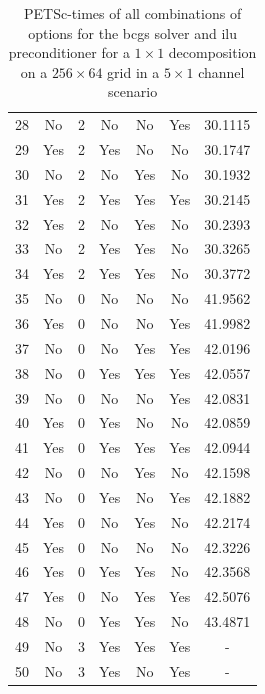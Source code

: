 \begin{table}[h]
\begin{tabular}{ccccccc}
    28 & No & 2 & No & No & Yes & 30.1115 \\
    29 & Yes & 2 & Yes & No & No & 30.1747 \\
    30 & No & 2 & No & Yes & No & 30.1932 \\
    31 & Yes & 2 & Yes & Yes & Yes & 30.2145 \\
    32 & Yes & 2 & No & Yes & No & 30.2393 \\
    33 & No & 2 & Yes & Yes & No & 30.3265 \\
    34 & Yes & 2 & Yes & Yes & No & 30.3772 \\
    35 & No & 0 & No & No & No & 41.9562 \\
    36 & Yes & 0 & No & No & Yes & 41.9982 \\
    37 & No & 0 & No & Yes & Yes & 42.0196 \\
    38 & No & 0 & Yes & Yes & Yes & 42.0557 \\
    39 & No & 0 & No & No & Yes & 42.0831 \\
    40 & Yes & 0 & Yes & No & No & 42.0859 \\
    41 & Yes & 0 & Yes & Yes & Yes & 42.0944 \\
    42 & No & 0 & No & Yes & No & 42.1598 \\
    43 & No & 0 & Yes & No & Yes & 42.1882 \\
    44 & Yes & 0 & No & Yes & No & 42.2174 \\
    45 & Yes & 0 & No & No & No & 42.3226 \\
    46 & Yes & 0 & Yes & Yes & No & 42.3568 \\
    47 & Yes & 0 & No & Yes & Yes & 42.5076 \\
    48 & No & 0 & Yes & Yes & No & 43.4871 \\
    \hline
    49 & No & 3 & Yes & Yes & Yes & - \\
    50 & No & 3 & Yes & No & Yes & - \\
    \hline
  \end{tabular}
  \caption{PETSc-times of all combinations of options for the bcgs solver and ilu preconditioner for a $1 \times 1$ decomposition on a $256 \times 64$ grid in a $5 \times 1$ channel scenario}
  \label{fig:petsc-opt-bcgs-1x1}
\end{table}

